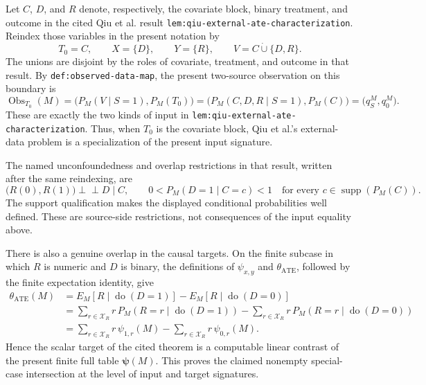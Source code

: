 Let \(C\), \(D\), and \(R\) denote, respectively, the covariate block, binary treatment, and outcome in the cited Qiu et al. result \texttt{lem:qiu-external-ate-characterization}. Reindex those variables in the present notation by
\[
T_0=C,\qquad X=\{D\},\qquad Y=\{R\},\qquad V=C\mathbin{\dot\cup}\{D,R\}.
\]
The unions are disjoint by the roles of covariate, treatment, and outcome in that result. By \texttt{def:observed-data-map}, the present two-source observation on this boundary is
\[
\operatorname{Obs}_{T_0}(M)
=\bigl(P_M(V\mid S=1),P_M(T_0)\bigr)
=\bigl(P_M(C,D,R\mid S=1),P_M(C)\bigr)
=\bigl(q_S^M,q_0^M\bigr).
\]
These are exactly the two kinds of input in \texttt{lem:qiu-external-ate-characterization}. Thus, when \(T_0\) is the covariate block, Qiu et al.'s external-data problem is a specialization of the present input signature.

The named unconfoundedness and overlap restrictions in that result, written after the same reindexing, are
\[
\bigl(R(0),R(1)\bigr)\mathbin{\perp\!\!\!\perp}D\mid C,
\qquad
0<P_M(D=1\mid C=c)<1
\quad\text{for every }c\in\operatorname{supp}(P_M(C)).
\]
The support qualification makes the displayed conditional probabilities well defined. These are source-side restrictions, not consequences of the input equality above.

There is also a genuine overlap in the causal targets. On the finite subcase in which \(R\) is numeric and \(D\) is binary, the definitions of \(\psi_{x,y}\) and \(\theta_{\mathrm{ATE}}\), followed by the finite expectation identity, give
\[
\begin{aligned}
\theta_{\mathrm{ATE}}(M)
&=E_M[R\mid\operatorname{do}(D=1)]-E_M[R\mid\operatorname{do}(D=0)]\\
&=\sum_{r\in\mathcal X_R}r\,P_M(R=r\mid\operatorname{do}(D=1))
  -\sum_{r\in\mathcal X_R}r\,P_M(R=r\mid\operatorname{do}(D=0))\\
&=\sum_{r\in\mathcal X_R}r\,\psi_{1,r}(M)
  -\sum_{r\in\mathcal X_R}r\,\psi_{0,r}(M).
\end{aligned}
\]
Hence the scalar target of the cited theorem is a computable linear contrast of the present finite full table \(\boldsymbol\psi(M)\). This proves the claimed nonempty special-case intersection at the level of input and target signatures.

